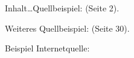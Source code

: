 \label{ch_intro}

\setcounter{page}{1}

Inhalt\ldots Quellbeispiel: \cite{Plenk2019} (Seite 2).

Weiteres Quellbeispiel: \cite{Siemens} (Seite 30).

Beispiel Internetquelle: \cite{Siemens2023}
